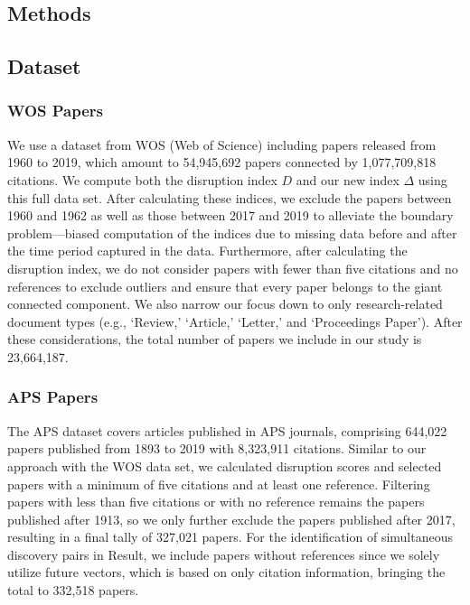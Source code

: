 \documentclass[12pt]{article}
\begin{document}
\begin{refsection}
\section{Methods}

 \subsection{Dataset}
\label{sec:method_dataset}


\subsubsection{WOS Papers}

We use a dataset from WOS (Web of Science) including papers released from 1960 to 2019, which amount to 54,945,692 papers connected by 1,077,709,818 citations. We compute both the disruption index $D$ and our new index $\Delta$ using this full data set. After calculating these indices, we exclude the papers between 1960 and 1962 as well as those between 2017 and 2019 to alleviate the boundary problem---biased computation of the indices due to missing data before and after the time period captured in the data. Furthermore, after calculating the disruption index, we do not consider papers with fewer than five citations and no references to exclude outliers and ensure that every paper belongs to the giant connected component. We also narrow our focus down to only research-related document types (e.g., `Review,' `Article,' `Letter,' and `Proceedings Paper').  After these considerations, the total number of papers we include in our study is 23,664,187.


\subsubsection{APS Papers}
The APS dataset covers articles published in APS journals, comprising 644,022 papers published from 1893 to 2019 with 8,323,911 citations. Similar to our approach with the WOS data set, we calculated disruption scores and selected papers with a minimum of five citations and at least one reference. Filtering papers with less than five citations or with no reference remains the papers published after 1913, so we only further exclude the papers published after 2017, resulting in a final tally of 327,021 papers. For the identification of simultaneous discovery pairs in Result, we include papers without references since we solely utilize future vectors, which is based on only citation information, bringing the total to 332,518 papers.


\end{refsection}
\end{document}
